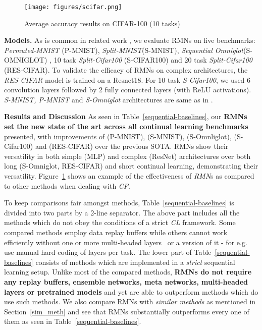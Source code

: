 \documentclass{article}
\begin{document}
\begin{figure}
\begin{center}
\centerline{\texttt{[image: figures/scifar.png]}}
\vspace{-\baselineskip}
\caption{Average accuracy results on CIFAR-100 (10 tasks)}
\label{scifar}
\end{center}
\vspace*{-2.8\baselineskip}
\end{figure}

\textbf{Models.} As is common in related work \cite{titsias2019functional, kirkpatrick2017overcoming, nguyen2017variational, pan2021continual, jung2020continual}, we evaluate RMNs on five benchmarks: \textit{Permuted-MNIST} \cite{kirkpatrick2017overcoming}(P-MNIST), \textit{Split-MNIST}(S-MNIST), \textit{Sequential Omniglot}(S-OMNIGLOT) \cite{schwarz2018progress}, 10 task \textit{Split-Cifar100} \cite{zenke2017continual}(S-CIFAR100) and 20 task \textit{Split-Cifar100} (RES-CIFAR). To validate the efficacy of RMNs on complex architectures, the \textit{RES-CIFAR} model is trained on a Resnet18. For 10 task \textit{S-Cifar100}, we used 6 convolution layers followed by 2 fully connected layers (with ReLU activations). \textit{S-MNIST, P-MNIST} and \textit{S-Omniglot} architectures are same as in \cite{titsias2019functional}.

\textbf{Results and Discussion}
As seen in Table~\ref{sequential-baselines}, our \textbf{RMNs set the new state of the art across all continual learning benchmarks} presented, with improvements of  (P-MNIST),  (S-MNIST),  (S-Omnliglot),  (S-Cifar100) and  (RES-CIFAR) over the previous SOTA. RMNs show their versatility in both simple (MLP) and complex (ResNet) architectures over both long (S-Omniglot, RES-CIFAR) and short continual learning, demonstrating their versatility. Figure~\ref{scifar} shows an example of the effectiveness of \textit{RMN}s as compared to other methods when dealing with \textit{CF}.

To keep comparisons fair amongst methods, Table~\ref{sequential-baselines} is divided into two parts by a 2-line separator. The above part includes all the methods which do not obey the conditions of a strict \textit{CL} framework.
Some compared methods\cite{nguyen2017variational, titsias2019functional, Chaudhry_2018_ECCV, guo2020improved, pan2021continual} employ data replay buffers while others cannot work efficiently without one or more multi-headed layers~\cite{nguyen2017variational, Chaudhry_2018_ECCV, jung2020continual} or a version of it - for e.g. \cite{Serr2018OvercomingCF} use manual hard coding of layers per task. The lower part of Table~\ref{sequential-baselines} consists of methods which are implemented in a \textit{strict} sequential learning setup.
Unlike most of the compared methods, \textbf{RMNs do not require any replay buffers, ensemble networks, meta networks, multi-headed layers or pretrained models} and yet are able to outperform methods which do use such methods.
We also compare RMNs with \textit{similar methods} as mentioned in Section~\ref{sim_meth} and see that RMNs substantially outperforms every one of them as seen in Table~\ref{sequential-baselines}.
\end{document}
